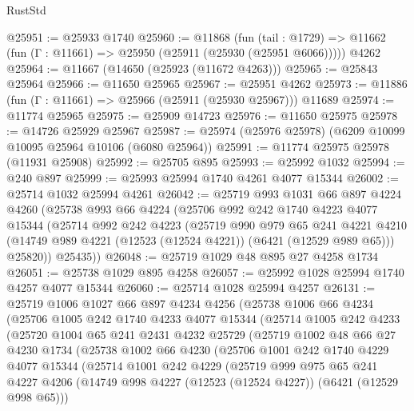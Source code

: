 \begin{lexlean}{RustStd}
\begin{coremodule}
@25951 := @25933 @1740
@25960 := @11868
    (fun (tail : @1729) => @11662 (fun (Γ : @11661) => @25950 (@25911 (@25930 (@25951 @6066)))))
    @4262
@25964 := @11667 (@14650 (@25923 (@11672 @4263)))
@25965 := @25843 @25964
@25966 := @11650 @25965
@25967 := @25951 @4262
@25973 := @11886 (fun (Γ : @11661) => @25966 (@25911 (@25930 @25967))) @11689
@25974 := @11774 @25965
@25975 := @25909 @14723
@25976 := @11650 @25975
@25978 := @14726 @25929 @25967
@25987 := @25974 (@25976 @25978) (@6209 @10099 @10095 @25964 @10106 (@6080 @25964))
@25991 := @11774 @25975 @25978 (@11931 @25908)
@25992 := @25705 @895
@25993 := @25992 @1032
@25994 := @240 @897
@25999 := @25993 @25994 @1740 @4261 @4077 @15344
@26002 := @25714 @1032 @25994 @4261
@26042 := @25719
    @993
    @1031
    @66
    @897
    @4224
    @4260
    (@25738
      @993
      @66
      @4224
      (@25706
        @992
        @242
        @1740
        @4223
        @4077
        @15344
        (@25714
          @992
          @242
          @4223
          (@25719
            @990
            @979
            @65
            @241
            @4221
            @4210
            (@14749 @989 @4221 (@12523 (@12524 @4221)) (@6421 (@12529 @989 @65)))
            @25820))
        @25435))
@26048 := @25719 @1029 @48 @895 @27 @4258 @1734
@26051 := @25738 @1029 @895 @4258
@26057 := @25992 @1028 @25994 @1740 @4257 @4077 @15344
@26060 := @25714 @1028 @25994 @4257
@26131 := @25719
    @1006
    @1027
    @66
    @897
    @4234
    @4256
    (@25738
      @1006
      @66
      @4234
      (@25706
        @1005
        @242
        @1740
        @4233
        @4077
        @15344
        (@25714
          @1005
          @242
          @4233
          (@25720
            @1004
            @65
            @241
            @2431
            @4232
            @25729
            (@25719
              @1002
              @48
              @66
              @27
              @4230
              @1734
              (@25738
                @1002
                @66
                @4230
                (@25706
                  @1001
                  @242
                  @1740
                  @4229
                  @4077
                  @15344
                  (@25714
                    @1001
                    @242
                    @4229
                    (@25719
                      @999
                      @975
                      @65
                      @241
                      @4227
                      @4206
                      (@14749 @998 @4227 (@12523 (@12524 @4227)) (@6421 (@12529 @998 @65)))

\end{coremodule}
\end{lexlean}
